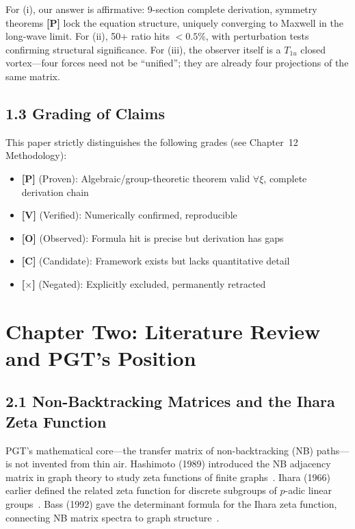 \documentclass[11pt,a4paper]{article}
\newcommand{\gradeP}{\textbf{[P]}}
\newcommand{\gradeV}{\textbf{[V]}}
\newcommand{\gradeO}{\textbf{[O]}}
\newcommand{\gradeC}{\textbf{[C]}}
\newcommand{\gradeX}{\textbf{[$\times$]}}
\begin{document}
For (i), our answer is affirmative: 9-section complete derivation, symmetry theorems \gradeP{} lock the equation structure, uniquely converging to Maxwell in the long-wave limit. For (ii), 50+ ratio hits $<0.5\%$, with perturbation tests confirming structural significance. For (iii), the observer itself is a $T_{1u}$ closed vortex---four forces need not be ``unified''; they are already four projections of the same matrix.

\subsection{1.3 Grading of Claims}

This paper strictly distinguishes the following grades (see Chapter~12 Methodology):
\begin{itemize}[nosep]
\item \gradeP{} (Proven): Algebraic/group-theoretic theorem valid $\forall\xi$, complete derivation chain
\item \gradeV{} (Verified): Numerically confirmed, reproducible
\item \gradeO{} (Observed): Formula hit is precise but derivation has gaps
\item \gradeC{} (Candidate): Framework exists but lacks quantitative detail
\item \gradeX{} (Negated): Explicitly excluded, permanently retracted
\end{itemize}

\section{Chapter Two: Literature Review and PGT's Position}\label{sec:ch2}

\subsection{2.1 Non-Backtracking Matrices and the Ihara Zeta Function}

PGT's mathematical core---the transfer matrix of non-backtracking (NB) paths---is not invented from thin air. Hashimoto (1989) introduced the NB adjacency matrix in graph theory to study zeta functions of finite graphs~\cite{hashimoto}. Ihara (1966) earlier defined the related zeta function for discrete subgroups of $p$-adic linear groups~\cite{ihara}. Bass (1992) gave the determinant formula for the Ihara zeta function, connecting NB matrix spectra to graph structure~\cite{bass}.
\end{document}
